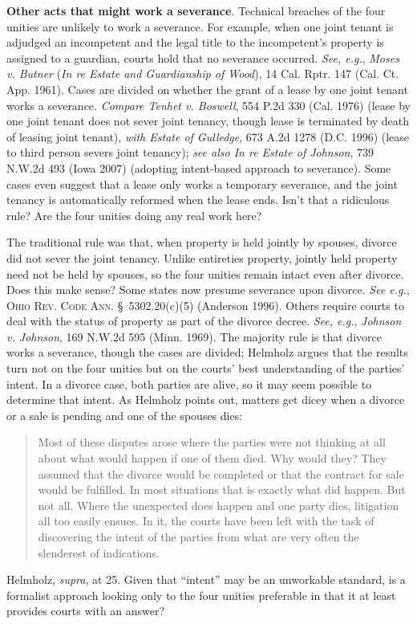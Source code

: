 \item \textbf{Other acts that might work a severance}. Technical breaches of the
four unities are unlikely to work a severance. For example, when one joint
tenant is adjudged an incompetent and the legal title to the incompetent's
property is assigned to a guardian, courts hold that no severance occurred.
\textit{See, e.g.}, \emph{Moses v. Butner} (\emph{In re Estate and Guardianship of Wood}), 14
Cal. Rptr. 147 (Cal. Ct. App. 1961). Cases are divided on whether the grant of
a lease by one joint tenant works a severance. \textit{Compare Tenhet v.
Boswell}, 554 P.2d 330 (Cal. 1976) (lease by one joint tenant does not sever
joint tenancy, though lease is terminated by death of leasing joint tenant),
\textit{with Estate of Gulledge}, 673 A.2d 1278 (D.C. 1996) (lease to third
person severs joint tenancy); \textit{see also In re Estate of Johnson}, 739
N.W.2d 493 (Iowa 2007) (adopting intent-based approach to severance). Some
cases even suggest that a lease only works a temporary severance, and the joint
tenancy is automatically reformed when the lease ends. Isn't that a ridiculous
rule? Are the four unities doing any real work here?


The traditional rule was that, when property is held jointly by spouses, divorce
did not sever the joint tenancy. Unlike entireties property, jointly held
property need not be held by spouses, so the four unities remain intact even
after divorce. Does this make sense? Some states now presume severance upon
divorce. \emph{See e.g.}, \textsc{Ohio Rev. Code Ann.} \S~5302.20(c)(5)
(Anderson 1996). Others require courts to deal with the status of property as
part of the divorce decree. \textit{See, e.g.}, \emph{Johnson v. Johnson}, 169
N.W.2d 595 (Minn. 1969). The majority rule is that divorce works a severance,
though the cases are divided; Helmholz argues that the results turn not on the
four unities but on the courts' best understanding of the parties' intent. In a
divorce case, both parties are alive, so it may seem possible to determine that
intent. As Helmholz points out, matters get dicey when a divorce or a sale is
pending and one of the spouses dies:
\begin{quote}
Most of these disputes arose where the parties were not thinking at all about
what would happen if one of them died. Why would they? They assumed that the
divorce would be completed or that the contract for sale would be fulfilled. In
most situations that is exactly what did happen. But not all. Where the
unexpected does happen and one party dies, litigation all too easily ensues. In
it, the courts have been left with the task of discovering the intent of the
parties from what are very often the slenderest of indications.
\end{quote}
Helmholz, \textit{supra}, at 25. Given that ``intent'' may be an unworkable
standard, is a formalist approach looking only to the four unities preferable
in that it at least provides courts with an answer?



